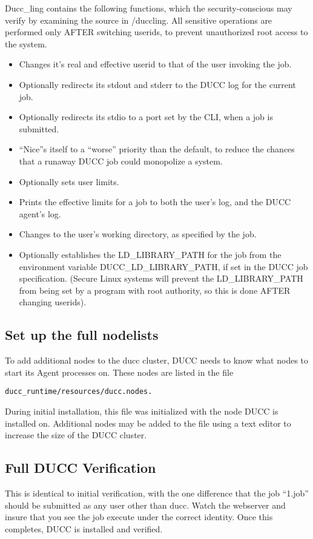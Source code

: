        Ducc\_ling contains the following functions, which the security-conscious may verify by examining
       the source in \duccruntime/duccling.  All sensitive operations are performed only AFTER switching
       userids, to prevent unauthorized root access to the system.
       \begin{itemize}
         \item Changes it's real and effective userid to that of the user invoking the job.
         \item Optionally redirects its stdout and stderr to the DUCC log for the current job.
         \item Optionally redirects its stdio to a port set by the CLI, when a job is submitted.
         \item ``Nice''s itself to a ``worse'' priority than the default, to reduce the chances
           that a runaway DUCC job could monopolize a system.
         \item Optionally sets user limits.
         \item Prints the effective limits for a job to both the user's log, and the DUCC agent's log.
         \item Changes to the user's working directory, as specified by the job.
         \item Optionally establishes the LD\_LIBRARY\_PATH for the job from the environment variable
           DUCC\_LD\_LIBRARY\_PATH, if set in the DUCC job specification. (Secure Linux systems will
           prevent the LD\_LIBRARY\_PATH from being set by a program with root authority, so this is
           done AFTER changing userids).
       \end{itemize}
       
\subsection{Set up the full nodelists}
To add additional nodes to the ducc cluster, DUCC needs to know what nodes to start its Agent
processes on.  These nodes are listed in the file
\begin{verbatim}
ducc_runtime/resources/ducc.nodes.  
\end{verbatim}

During initial installation, this file was initialized with the node DUCC is installed on.
Additional nodes may be added to the file using a text editor to increase the size of the DUCC
cluster.

\subsection{Full DUCC Verification}

This is identical to initial verification, with the one difference that the job ``1.job'' should be
submitted as any user other than ducc.  Watch the webserver and insure that you see the job execute
under the correct identity.  Once this completes, DUCC is installed and verified.

